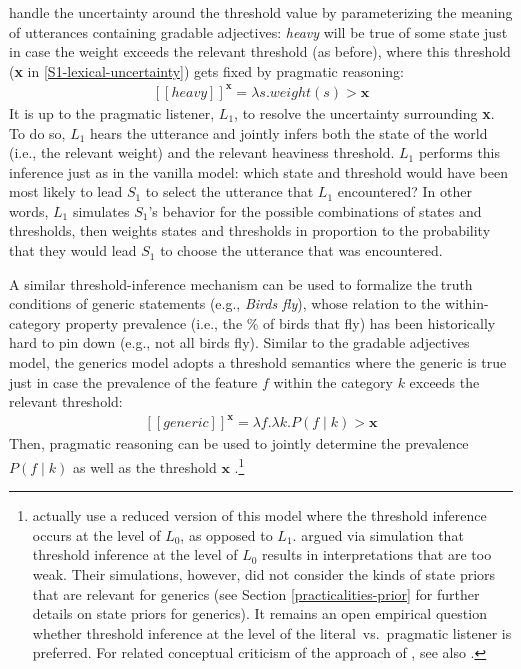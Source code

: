 \documentclass{sp}
\newcommand{\lam}{\ensuremath{\lambda}}
\newcommand{\sem}[1]{\ensuremath{[\![#1]\!]}}
\begin{document}
\citeauthor{lassitergoodman2013} handle the uncertainty around the threshold value by parameterizing the meaning of utterances containing gradable adjectives: \emph{heavy} will be true of some state just in case the weight exceeds the relevant threshold (as before), where this threshold (\textbf{x} in \eqref{S1-lexical-uncertainty}) gets fixed by pragmatic reasoning:
%
\begin{align}
\label{heavy-sem}
\sem{heavy}^{\textbf{x}} = \lam s. weight(s) > \textbf{x}
\end{align}
%
It is up to the pragmatic listener, $L_1$, to resolve the uncertainty surrounding \textbf{x}. To do so, $L_1$ hears the utterance and jointly infers both the state of the world (i.e., the relevant weight) and the relevant heaviness threshold. $L_1$ performs this inference just as in the vanilla model: which state and threshold would have been most likely to lead $S_1$ to select the utterance that $L_1$ encountered? In other words, $L_1$ simulates $S_1$'s behavior for the possible combinations of states and thresholds, then weights states and thresholds in proportion to the probability that they would lead $S_1$ to choose the utterance that was encountered.

A similar threshold-inference mechanism can be used to formalize the truth conditions of generic statements (e.g., \emph{Birds fly}), whose relation to the within-category property prevalence (i.e., the \% of birds that fly) has been historically hard to pin down (e.g., not all birds fly). 
Similar to the gradable adjectives model, the generics model adopts a threshold semantics where the generic is true just in case the prevalence of the feature $f$ within the category $k$ exceeds the relevant threshold:
%
\begin{align}
\label{generic-sem}
\sem{generic}^{\textbf{x}} = \lam f. \lam k. P(f \mid k) > \textbf{x}
\end{align}
%
Then, pragmatic reasoning can be used to jointly determine the prevalence  $P(f \mid k)$ as well as the threshold $\textbf{x}$ \citep{tesslergoodman2019}.\footnote{
\cite{tesslergoodman2019} actually use a reduced version of this model where the threshold inference occurs at the level of $L_0$, as opposed to $L_1$. \cite{goodmanlassiter2015handbook} argued via simulation that threshold inference at the level of $L_0$ results in interpretations that are too weak.
Their simulations, however, did not consider the kinds of state priors that are relevant for generics (see Section \ref{practicalities-prior} for further details on state priors for generics). 
It remains an open empirical question whether threshold inference at the level of the literal~vs.~pragmatic listener is preferred.
For related conceptual criticism of the approach of \cite{lassiter2017adjectival}, see also \cite{QingFranke2014:Gradable-Adject}.
}
\end{document}
